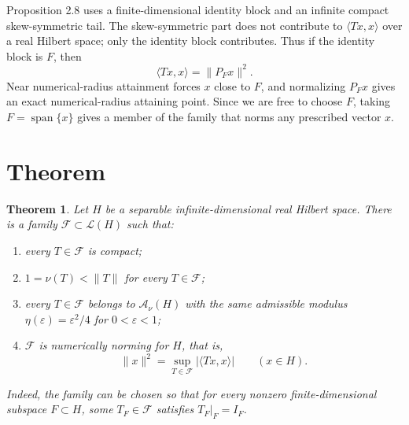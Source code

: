 \documentclass[11pt]{article}
\newtheorem{theorem}{Theorem}
\newcommand{\Anu}{\mathcal A_{\nu}}
\newcommand{\Lcal}{\mathcal L}
\begin{document}
Proposition 2.8 uses a finite-dimensional identity block and an infinite compact skew-symmetric tail. The skew-symmetric part does not contribute to \(\langle Tx,x\rangle\) over a real Hilbert space; only the identity block contributes. Thus if the identity block is \(F\), then
\[
\langle Tx,x\rangle=\|P_Fx\|^2.
\]
Near numerical-radius attainment forces \(x\) close to \(F\), and normalizing \(P_Fx\) gives an exact numerical-radius attaining point. Since we are free to choose \(F\), taking \(F=\operatorname{span}\{x\}\) gives a member of the family that norms any prescribed vector \(x\).

\section*{Theorem}

\begin{theorem}
Let \(H\) be a separable infinite-dimensional real Hilbert space. There is a family \(\mathscr F\subset\Lcal(H)\) such that:
\begin{enumerate}
\item every \(T\in\mathscr F\) is compact;
\item \(1=\nu(T)<\|T\|\) for every \(T\in\mathscr F\);
\item every \(T\in\mathscr F\) belongs to \(\Anu(H)\) with the same admissible modulus \(\eta(\varepsilon)=\varepsilon^2/4\) for \(0<\varepsilon<1\);
\item \(\mathscr F\) is numerically norming for \(H\), that is,
\[
\|x\|^2=\sup_{T\in\mathscr F}|\langle Tx,x\rangle|
\qquad (x\in H).
\]
\end{enumerate}
Indeed, the family can be chosen so that for every nonzero finite-dimensional subspace \(F\subset H\), some \(T_F\in\mathscr F\) satisfies \(T_F|_F=I_F\).
\end{theorem}
\end{document}
